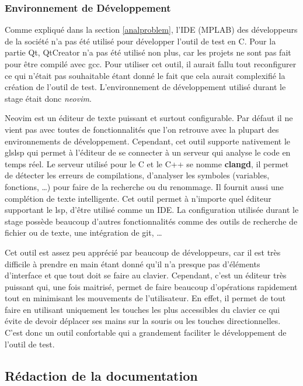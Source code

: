 \documentclass[a4paper]{article}
\begin{document}
\subsubsection{Environnement de Développement}%

Comme expliqué dans la section \ref{analproblem}, l'IDE (MPLAB) des développeurs
de la société n'a pas été utilisé pour développer l'outil de test en C. Pour la
partie Qt, QtCreator n'a pas été utilisé non plus, car les projets ne sont pas
fait pour être compilé avec gcc. Pour utiliser cet outil, il aurait fallu tout
reconfigurer ce qui n'était pas souhaitable étant donné le fait que cela aurait
complexifié la création de l'outil de test. L'environnement de développement
utilisé durant le stage était donc \textit{neovim}.

Neovim est un éditeur de texte puissant et surtout configurable. Par défaut il
ne vient pas avec toutes de fonctionnalités que l'on retrouve avec la plupart
des environnements de développement. Cependant, cet outil supporte nativement le
gls{lsp} qui permet à l'éditeur de se connecter à un serveur qui analyse le code
en temps réel. Le serveur utilisé pour le C et le C++ se nomme \textbf{clangd},
il permet de détecter les erreurs de compilations, d'analyser les symboles
(variables, fonctions, \dots) pour faire de la recherche ou du renommage. Il
fournit aussi une complétion de texte intelligente. Cet outil permet à n'importe
quel éditeur supportant le \gls{lsp}, d'être utilisé comme un IDE. La
configuration utilisée durant le stage possède beaucoup d'autres fonctionnalités
comme des outils de recherche de fichier ou de texte, une intégration de git,
\dots

Cet outil est assez peu apprécié par beaucoup de développeurs, car il est très
difficile à prendre en main étant donné qu'il n'a presque pas d'éléments
d'interface et que tout doit se faire au clavier. Cependant, c'est un éditeur
très puissant qui, une fois maitrisé, permet de faire beaucoup d'opérations
rapidement tout en minimisant les mouvements de l'utilisateur. En effet, il
permet de tout faire en utilisant uniquement les touches les plus accessibles du
clavier ce qui évite de devoir déplacer ses mains sur la souris ou les touches
directionnelles. C'est donc un outil confortable qui a grandement faciliter le
développement de l'outil de test.
\subsection{Rédaction de la documentation}%
\end{document}
